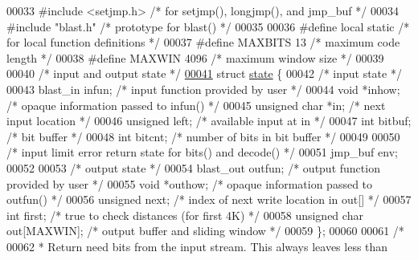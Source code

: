 \begin{DoxyCode}
00033 \textcolor{preprocessor}{#include <setjmp.h>}             \textcolor{comment}{/* for setjmp(), longjmp(), and jmp\_buf */}
00034 \textcolor{preprocessor}{#include "blast.h"}              \textcolor{comment}{/* prototype for blast() */}
00035 
00036 \textcolor{preprocessor}{#define local static            }\textcolor{comment}{/* for local function definitions */}\textcolor{preprocessor}{}
00037 \textcolor{preprocessor}{#define MAXBITS 13              }\textcolor{comment}{/* maximum code length */}\textcolor{preprocessor}{}
00038 \textcolor{preprocessor}{#define MAXWIN 4096             }\textcolor{comment}{/* maximum window size */}\textcolor{preprocessor}{}
00039 
00040 \textcolor{comment}{/* input and output state */}
\hyperlink{structstate}{00041} \textcolor{keyword}{struct }\hyperlink{structstate}{state} \{
00042     \textcolor{comment}{/* input state */}
00043     blast\_in infun;             \textcolor{comment}{/* input function provided by user */}
00044     \textcolor{keywordtype}{void} *inhow;                \textcolor{comment}{/* opaque information passed to infun() */}
00045     \textcolor{keywordtype}{unsigned} \textcolor{keywordtype}{char} *in;          \textcolor{comment}{/* next input location */}
00046     \textcolor{keywordtype}{unsigned} left;              \textcolor{comment}{/* available input at in */}
00047     \textcolor{keywordtype}{int} bitbuf;                 \textcolor{comment}{/* bit buffer */}
00048     \textcolor{keywordtype}{int} bitcnt;                 \textcolor{comment}{/* number of bits in bit buffer */}
00049 
00050     \textcolor{comment}{/* input limit error return state for bits() and decode() */}
00051     jmp\_buf env;
00052 
00053     \textcolor{comment}{/* output state */}
00054     blast\_out outfun;           \textcolor{comment}{/* output function provided by user */}
00055     \textcolor{keywordtype}{void} *outhow;               \textcolor{comment}{/* opaque information passed to outfun() */}
00056     \textcolor{keywordtype}{unsigned} next;              \textcolor{comment}{/* index of next write location in out[] */}
00057     \textcolor{keywordtype}{int} first;                  \textcolor{comment}{/* true to check distances (for first 4K) */}
00058     \textcolor{keywordtype}{unsigned} \textcolor{keywordtype}{char} out[MAXWIN];  \textcolor{comment}{/* output buffer and sliding window */}
00059 \};
00060 
00061 \textcolor{comment}{/*}
00062 \textcolor{comment}{ * Return need bits from the input stream.  This always leaves less than}

\end{DoxyCode}
